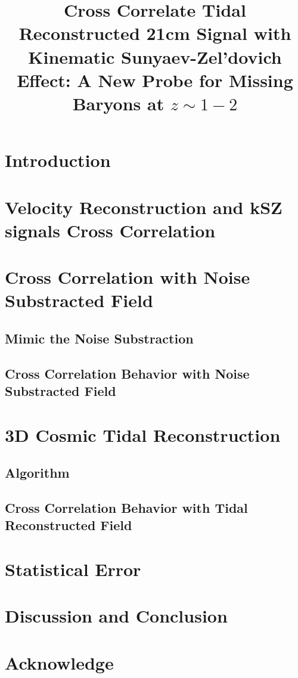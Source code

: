 \documentclass[aps,prd,twocolumn,showpacs,superscriptaddress,groupedaddress,nofootinbib]{revtex4}  %
\begin{document}
\widetext

\title{Cross Correlate Tidal Reconstructed 21cm Signal with Kinematic Sunyaev-Zel'dovich Effect: A New Probe for Missing Baryons at $z\sim1-2$}
%

\pacs{}
\maketitle

\section{Introduction}


\section{Velocity Reconstruction and kSZ signals Cross Correlation}

\section{Cross Correlation with Noise Substracted Field} 
\subsection{Mimic the Noise Substraction}

\subsection{Cross Correlation Behavior with Noise Substracted Field}

\section{3D Cosmic Tidal Reconstruction}
\subsection{Algorithm}

\subsection{Cross Correlation Behavior with Tidal Reconstructed Field}

\section{Statistical Error}

%
\section{Discussion and Conclusion}

\section{Acknowledge}



\end{document}
